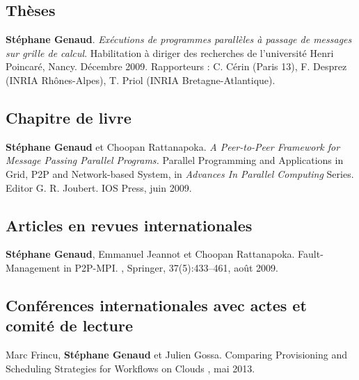 \documentclass[11pt]{article}
\begin{document}
\small

\begin{thebibliography}{99}

\subsection*{Thèses}

\textbf{Stéphane Genaud}.
\newblock 
{\em Exécutions de programmes parallèles à passage de messages sur grille de 
calcul}.
\newblock 
Habilitation à diriger des recherches de l'université Henri Poincaré, 
Nancy. Décembre 2009.
\newblock 
Rapporteurs : C. Cérin (Paris 13), F. Desprez (INRIA Rhônes-Alpes), 
T. Priol (INRIA Bretagne-Atlantique).\\[2mm]

\subsection*{Chapitre de livre}

\textbf{Stéphane Genaud} et Choopan Rattanapoka.
\newblock 
\emph{A Peer-to-Peer Framework for Message Passing Parallel Programs.}
\newblock 
Parallel Programming and Applications in Grid, P2P and Network-based System,
in {\em Advances In Parallel Computing} Series. Editor G. R. Joubert.
IOS Press, juin 2009. 
 

\subsection*{Articles en revues internationales}

\setlength{\itemsep}{1.5mm}


\newblock \textbf{Stéphane Genaud}, Emmanuel Jeannot et Choopan Rattanapoka.
\newblock Fault-Management in P2P-MPI.
, Springer, 
37(5):433--461, août 2009.


\subsection*{Conférences internationales avec actes et comité de lecture}

Marc Frincu, \textbf{Stéphane Genaud} et Julien Gossa.
\newblock Comparing Provisioning and Scheduling Strategies for Workflows on Clouds
, mai 2013.


\end{thebibliography}
\end{document}
